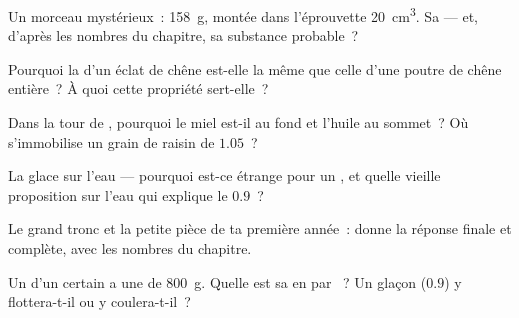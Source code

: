 \begin{exercise}[$\star$]\label{exo:g6:density-floating:4}
Un morceau mystérieux~:  \qty{158}{g}, montée dans l'éprouvette
\qty{20}{cm^3}. Sa  --- et, d'après les nombres du
chapitre, sa substance probable~?
\end{exercise}

\begin{exercise}[$\star$]\label{exo:g6:density-floating:5}
Pourquoi la  d'un éclat de chêne est-elle la même que
celle d'une poutre de chêne entière~? À quoi cette propriété
sert-elle~?
\end{exercise}

\begin{exercise}[$\star$]\label{exo:g6:density-floating:6}
Dans la tour de , pourquoi le miel est-il au fond et l'huile
au sommet~? Où s'immobilise un grain de raisin de 
$1.05$~?
\end{exercise}

\begin{exercise}[$\star$]\label{exo:g6:density-floating:7}
La glace  sur l'eau --- pourquoi est-ce étrange pour un ,
et quelle vieille proposition sur l'eau qui  explique le $0.9$~?
\end{exercise}

\begin{exercise}[$\star$]\label{exo:g6:density-floating:8}
Le grand tronc et la petite pièce de ta première année~: donne la
réponse finale et complète, avec les nombres du chapitre.
\end{exercise}

\begin{exercise}[$\star\star$]\label{exo:g6:density-floating:9}
Un  d'un certain  a une  de \qty{800}{g}. Quelle est
sa  en  par ~? Un glaçon
($0.9$) y flottera-t-il ou y coulera-t-il~?
\end{exercise}

